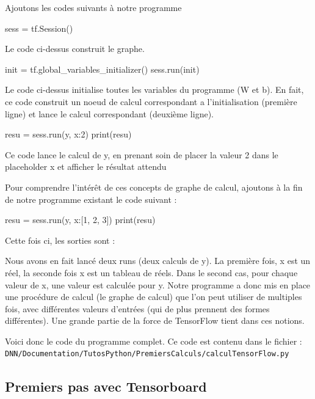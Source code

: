 \documentclass[a4paper,11pt]{book}
\begin{document}
Ajoutons les codes suivants à notre programme
\begin{mypython}
sess = tf.Session()
\end{mypython}
Le code ci-dessus construit le graphe.
\begin{mypython}
init = tf.global_variables_initializer()
sess.run(init)
\end{mypython}
Le code ci-dessus initialise toutes les variables du programme (W et b). En fait, ce code construit un noeud de calcul correspondant a l'initialisation (première ligne) et lance le calcul correspondant (deuxième ligne).

\begin{mypython} 
resu = sess.run(y, {x:2}) 
print(resu)
\end{mypython}
Ce code lance le calcul de y, en prenant soin de placer la valeur 2 dans le placeholder x et afficher le résultat attendu
\begin{myoutput}
[0.3]
\end{myoutput}
Pour comprendre l'intérêt de ces concepts de graphe de calcul, ajoutons à la fin de notre programme existant le code suivant :

\begin{mypython} 
resu = sess.run(y, {x:[1, 2, 3]}) 
print(resu)
\end{mypython} 

Cette fois ci, les sorties sont :

\begin{mypython} 
[0.3]
[0.  0.3 0.6]
\end{mypython} 

Nous avons en fait lancé deux runs (deux calculs de y). La première fois, x est un réel, la seconde fois x est un tableau de réels. Dans le second cas, pour chaque valeur de x, une valeur est calculée pour y.
Notre programme a donc mis en place une procédure de calcul (le graphe de calcul) que l'on peut utiliser de multiples fois, avec différentes valeurs d'entrées (qui de plus prennent des formes différentes).
Une grande partie de la force de TensorFlow tient dans ces notions.

Voici donc le code du programme complet. Ce code est contenu dans le fichier :\\
\verb+DNN/Documentation/TutosPython/PremiersCalculs/calculTensorFlow.py+



\subsection{Premiers pas avec Tensorboard}
\end{document}
